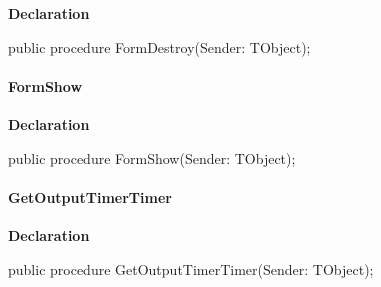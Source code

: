\documentclass{report}
\newif\ifpdf
\begin{document}
\label{mainunit.TIWizFrm-FormDestroy}
\begin{list}{}{
\setlength{\itemindent}{0cm}
\setlength{\listparindent}{0cm}
\setlength{\leftmargin}{\evensidemargin}
\addtolength{\leftmargin}{\tmplength}
\settowidth{\labelsep}{X}
\addtolength{\leftmargin}{\labelsep}
\setlength{\labelwidth}{\tmplength}
}
\item[\textbf{Declaration}\hfill]
\ifpdf
\begin{flushleft}
\fi
\begin{ttfamily}
public procedure FormDestroy(Sender: TObject);\end{ttfamily}

\ifpdf
\end{flushleft}
\fi

\end{list}
\paragraph*{FormShow}\hspace*{\fill}

\label{mainunit.TIWizFrm-FormShow}
\begin{list}{}{
\setlength{\itemindent}{0cm}
\setlength{\listparindent}{0cm}
\setlength{\leftmargin}{\evensidemargin}
\addtolength{\leftmargin}{\tmplength}
\settowidth{\labelsep}{X}
\addtolength{\leftmargin}{\labelsep}
\setlength{\labelwidth}{\tmplength}
}
\item[\textbf{Declaration}\hfill]
\ifpdf
\begin{flushleft}
\fi
\begin{ttfamily}
public procedure FormShow(Sender: TObject);\end{ttfamily}

\ifpdf
\end{flushleft}
\fi

\end{list}
\paragraph*{GetOutputTimerTimer}\hspace*{\fill}

\label{mainunit.TIWizFrm-GetOutputTimerTimer}
\begin{list}{}{
\setlength{\itemindent}{0cm}
\setlength{\listparindent}{0cm}
\setlength{\leftmargin}{\evensidemargin}
\addtolength{\leftmargin}{\tmplength}
\settowidth{\labelsep}{X}
\addtolength{\leftmargin}{\labelsep}
\setlength{\labelwidth}{\tmplength}
}
\item[\textbf{Declaration}\hfill]
\ifpdf
\begin{flushleft}
\fi
\begin{ttfamily}
public procedure GetOutputTimerTimer(Sender: TObject);\end{ttfamily}

\ifpdf
\end{flushleft}
\fi

\end{list}
\end{document}
